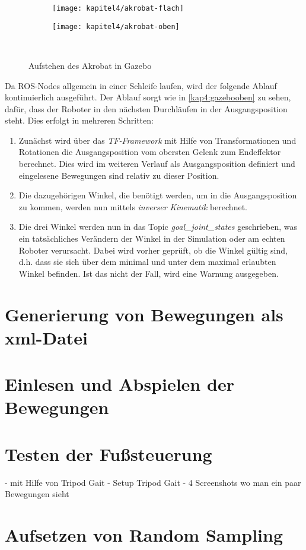 \begin{figure}[b!]
  \centering
  \begin{subfigure}[b]{.4\linewidth}
    \centering
    \texttt{[image: kapitel4/akrobat-flach]}
    \label{kap4:gazeboflach}
  \end{subfigure}%
  \qquad
  \begin{subfigure}[b]{.4\linewidth}
    \centering
    \texttt{[image: kapitel4/akrobat-oben]}
    \label{kap4:gazebooben}
  \end{subfigure}\\
  \caption{Aufstehen des Akrobat in Gazebo}
  \label{kap4gazebo}
\end{figure}

Da \ac{ROS}-Nodes allgemein in einer Schleife laufen, wird der folgende Ablauf kontinuierlich ausgeführt. Der Ablauf sorgt wie in \autoref{kap4:gazebooben} zu sehen, dafür, dass der Roboter in den nächsten Durchläufen in der Ausgangsposition steht. Dies erfolgt in mehreren Schritten: 
\begin{enumerate}
  \item Zunächst wird über das \textit{TF-Framework} mit Hilfe von Transformationen und Rotationen die Ausgangsposition vom obersten Gelenk zum Endeffektor berechnet. Dies wird im weiteren Verlauf als Ausgangsposition definiert und eingelesene Bewegungen sind relativ zu dieser Position.
  \item Die dazugehörigen Winkel, die benötigt werden, um in die Ausgangsposition zu kommen, werden nun mittels \textit{inverser Kinematik} berechnet.
  \item Die drei Winkel werden nun in das Topic \textit{goal\_joint\_states} geschrieben, was ein tatsächliches Verändern der Winkel in der Simulation oder am echten Roboter verursacht. Dabei wird vorher geprüft, ob die Winkel gültig sind, d.h. dass sie sich über dem minimal und unter dem maximal erlaubten Winkel befinden. Ist das nicht der Fall, wird eine Warnung ausgegeben.
\end{enumerate}

\section{Generierung von Bewegungen als xml-Datei}

\section{Einlesen und Abspielen der Bewegungen}

\autocite{pugixml}

\section{Testen der Fußsteuerung}

- mit Hilfe von Tripod Gait
- Setup Tripod Gait
- 4 Screenshots wo man ein paar Bewegungen sieht

\section{Aufsetzen von Random Sampling}
